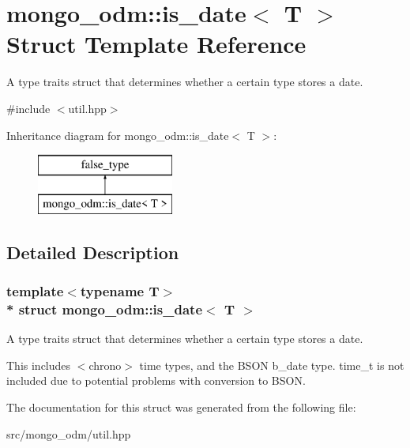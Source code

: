 \hypertarget{structmongo__odm_1_1is__date}{}\section{mongo\+\_\+odm\+:\+:is\+\_\+date$<$ T $>$ Struct Template Reference}
\label{structmongo__odm_1_1is__date}


A type traits struct that determines whether a certain type stores a date.  




{\ttfamily \#include $<$util.\+hpp$>$}

Inheritance diagram for mongo\+\_\+odm\+:\+:is\+\_\+date$<$ T $>$\+:\begin{figure}[H]
\begin{center}
\leavevmode
\includegraphics[height=2.000000cm]{structmongo__odm_1_1is__date}
\end{center}
\end{figure}


\subsection{Detailed Description}
\subsubsection*{template$<$typename T$>$\\*
struct mongo\+\_\+odm\+::is\+\_\+date$<$ T $>$}

A type traits struct that determines whether a certain type stores a date. 

This includes $<$chrono$>$ time types, and the B\+S\+ON b\+\_\+date type. time\+\_\+t is not included due to potential problems with conversion to B\+S\+ON. 

The documentation for this struct was generated from the following file\+:\begin{DoxyCompactItemize}
\item 
src/mongo\+\_\+odm/util.\+hpp\end{DoxyCompactItemize}
